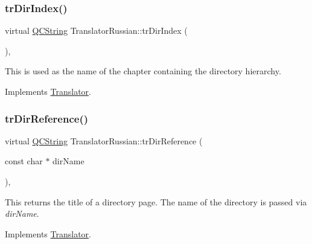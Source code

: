 \mbox{\label{class_translator_russian_a2fa1f236b39b63ff78649e21db1edbd0}} 
\subsubsection{\texorpdfstring{trDirIndex()}{trDirIndex()}}
{\footnotesize\ttfamily virtual \mbox{\hyperlink{class_q_c_string}{Q\+C\+String}} Translator\+Russian\+::tr\+Dir\+Index (\begin{DoxyParamCaption}{ }\end{DoxyParamCaption})\hspace{0.3cm}{\ttfamily [inline]}, {\ttfamily [virtual]}}

This is used as the name of the chapter containing the directory hierarchy. 

Implements \mbox{\hyperlink{class_translator}{Translator}}.

\mbox{\label{class_translator_russian_a0376edfd80fc416ee6da07fa1c92e9a3}} 
\subsubsection{\texorpdfstring{trDirReference()}{trDirReference()}}
{\footnotesize\ttfamily virtual \mbox{\hyperlink{class_q_c_string}{Q\+C\+String}} Translator\+Russian\+::tr\+Dir\+Reference (\begin{DoxyParamCaption}\item[{const char $\ast$}]{dir\+Name }\end{DoxyParamCaption})\hspace{0.3cm}{\ttfamily [inline]}, {\ttfamily [virtual]}}

This returns the title of a directory page. The name of the directory is passed via {\itshape dir\+Name}. 

Implements \mbox{\hyperlink{class_translator}{Translator}}.

\mbox{\label{class_translator_russian_a02d1006d9bde90d6bc903291d9ab14bf}} 

